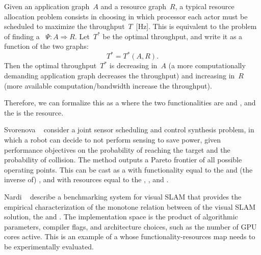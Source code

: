 Given an application graph~$A$ and a resource graph~$R$, a typical resource allocation problem consists in choosing in which processor each actor must be scheduled to maximize the throughput~$T$~[Hz].
This is equivalent to the problem of finding a ~$\Psi \colon A \Rightarrow R$.
Let~$T^{\ast}$ be the optimal throughput, and write it as a function of the two graphs:
\begin{equation}
    T^{\ast}=T^{\ast}(A,R).
\end{equation}
Then the optimal throughput~$T^{\ast}$ is decreasing in~$A$ (a more computationally demanding application graph decreases the throughput) and increasing in~$R$ (more available computation/bandwidth increase the throughput).

Therefore, we can formalize this as a  where the two functionalities are  and , and the  is the resource.

\begin{figure*}[h!]
    \centering
    \caption{}
\end{figure*}

\begin{example}
    Svorenova\,\,\etal~\cite{svorenova16resource} consider a joint sensor scheduling and control synthesis problem, in which a robot can decide to not perform sensing to save power, given performance objectives on the probability of reaching the target and the probability of collision.
    The method outputs a Pareto frontier of all possible operating points.
    This can be cast as a  with functionality equal to the  and (the inverse of) , and with resources equal to the
    , , and .
\end{example}

\begin{figure}[h]
    \centering
    \caption{}
    \label{fig:progressive-1-1}
\end{figure}

\begin{example}
    Nardi\,\,\etal~\cite{zia16comparative} describe a benchmarking system for visual SLAM that provides the empirical characterization of the monotone relation between  of the visual SLAM solution, the  and .
    The implementation space is the product of algorithmic parameters, compiler flags, and architecture choices, such as the number of GPU cores active.
    This is an example of a  whose functionality-resources map needs to be experimentally evaluated.
\end{example}

